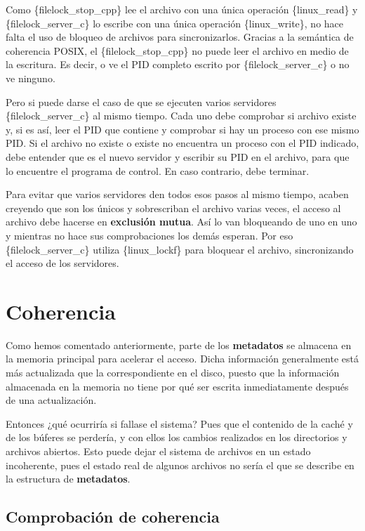 Como \{filelock\_stop\_cpp\} lee el archivo con una única operación
\{linux\_read\} y \{filelock\_server\_c\} lo escribe con una única
operación \{linux\_write\}, no hace falta el uso de bloqueo de archivos
para sincronizarlos. Gracias a la semántica de coherencia POSIX, el
\{filelock\_stop\_cpp\} no puede leer el archivo en medio de la
escritura. Es decir, o ve el PID completo escrito por
\{filelock\_server\_c\} o no ve ninguno.

Pero si puede darse el caso de que se ejecuten varios servidores
\{filelock\_server\_c\} al mismo tiempo. Cada uno debe comprobar si
archivo existe y, si es así, leer el PID que contiene y comprobar si hay
un proceso con ese mismo PID. Si el archivo no existe o existe no
encuentra un proceso con el PID indicado, debe entender que es el nuevo
servidor y escribir su PID en el archivo, para que lo encuentre el
programa de control. En caso contrario, debe terminar.

Para evitar que varios servidores den todos esos pasos al mismo tiempo,
acaben creyendo que son los únicos y sobrescriban el archivo varias
veces, el acceso al archivo debe hacerse en \textbf{exclusión mutua}.
Así lo van bloqueando de uno en uno y mientras no hace sus
comprobaciones los demás esperan. Por eso \{filelock\_server\_c\}
utiliza \{linux\_lockf\} para bloquear el archivo, sincronizando el
acceso de los servidores.

\section{Coherencia}\label{_coherencia}

Como hemos comentado anteriormente, parte de los \textbf{metadatos} se
almacena en la memoria principal para acelerar el acceso. Dicha
información generalmente está más actualizada que la correspondiente en
el disco, puesto que la información almacenada en la memoria no tiene
por qué ser escrita inmediatamente después de una actualización.

Entonces ¿qué ocurriría si fallase el sistema? Pues que el contenido de
la caché y de los búferes se perdería, y con ellos los cambios
realizados en los directorios y archivos abiertos. Esto puede dejar el
sistema de archivos en un estado incoherente, pues el estado real de
algunos archivos no sería el que se describe en la estructura de
\textbf{metadatos}.

\subsection{Comprobación de
coherencia}\label{_comprobaciuxf3n_de_coherencia}

